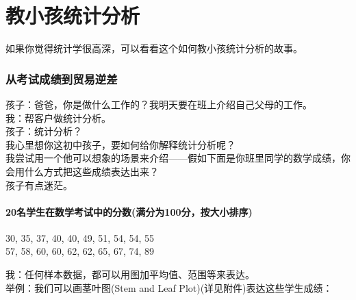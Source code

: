 \chapter{教小孩统计分析} %


如果你觉得统计学很高深，可以看看这个如何教小孩统计分析的故事。

\hypertarget{ux7bb1ux7ebfux56fe-box-and-whisker-plot}{%
\subsection{从考试成绩到贸易逆差}\label{ux7bb1ux7ebfux56fe-box-and-whisker-plot}}

孩子：爸爸，你是做什么工作的？我明天要在班上介绍自己父母的工作。\\
我：帮客户做统计分析。\\
孩子：统计分析？\\
我心里想你这初中孩子，要如何给你解释统计分析呢？\\
我尝试用一个他可以想象的场景来介绍------假如下面是你班里同学的数学成绩，你会用什么方式把这些成绩表达出来？\\
孩子有点迷茫。\\

\hypertarget{ux4eceux5206ux6790ux5230ux884cux52a8}{%
\subsubsection{20名学生在数学考试中的分数(满分为100分，按大小排序)}\label{ux4eceux5206ux6790ux5230ux884cux52a8}}

30, 35, 37, 40, 40, 49, 51, 54, 54, 55\\
57, 58, 60, 60, 62, 62, 65, 67, 74, 89

我：任何样本数据，都可以用图加平均值、范围等来表达。\\
举例：我们可以画茎叶图(Stem and Leaf Plot)(详见附件)表达这些学生成绩：\\

